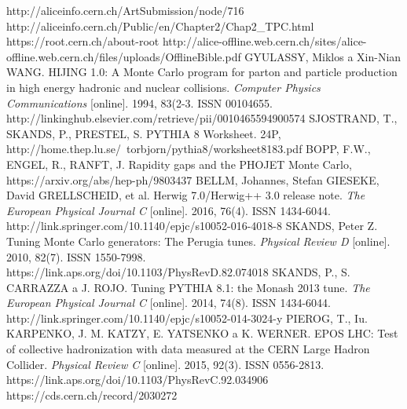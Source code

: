 \documentclass[thesismargins, thesislinespacing]{rnthesis}
\begin{document}
\begin{thebibliography}{}
http://aliceinfo.cern.ch/ArtSubmission/node/716
http://aliceinfo.cern.ch/Public/en/Chapter2/Chap2\_TPC.html
https://root.cern.ch/about-root 
http://alice-offline.web.cern.ch/sites/alice-offline.web.cern.ch/files/uploads/OfflineBible.pdf
GYULASSY, Miklos a Xin-Nian WANG. HIJING 1.0: A Monte Carlo program for parton and particle production in high energy hadronic and nuclear collisions. \textit{Computer Physics Communications} [online]. 1994, 83(2-3. ISSN 00104655. http://linkinghub.elsevier.com/retrieve/pii/0010465594900574
SJOSTRAND, T., SKANDS, P., PRESTEL, S. PYTHIA 8 Worksheet. 24P, http://home.thep.lu.se/~torbjorn/pythia8/worksheet8183.pdf
BOPP, F.W., ENGEL, R., RANFT, J. Rapidity gaps and the PHOJET Monte Carlo, https://arxiv.org/abs/hep-ph/9803437
BELLM, Johannes, Stefan GIESEKE, David GRELLSCHEID, et al. Herwig 7.0/Herwig++ 3.0 release note. \textit{The European Physical Journal C} [online]. 2016, 76(4). ISSN 1434-6044. http://link.springer.com/10.1140/epjc/s10052-016-4018-8
SKANDS, Peter Z. Tuning Monte Carlo generators: The Perugia tunes. \textit{Physical Review D }[online]. 2010, 82(7). ISSN 1550-7998. https://link.aps.org/doi/10.1103/PhysRevD.82.074018
SKANDS, P., S. CARRAZZA a J. ROJO. Tuning PYTHIA 8.1: the Monash 2013 tune. \textit{The European Physical Journal C} [online]. 2014, 74(8). ISSN 1434-6044. http://link.springer.com/10.1140/epjc/s10052-014-3024-y
PIEROG, T., Iu. KARPENKO, J. M. KATZY, E. YATSENKO a K. WERNER. EPOS LHC: Test of collective hadronization with data measured at the CERN Large Hadron Collider. \textit{Physical Review C} [online]. 2015, 92(3). ISSN 0556-2813.
 https://link.aps.org/doi/10.1103/PhysRevC.92.034906
 https://cds.cern.ch/record/2030272
\end{thebibliography}
%
\end{document}
